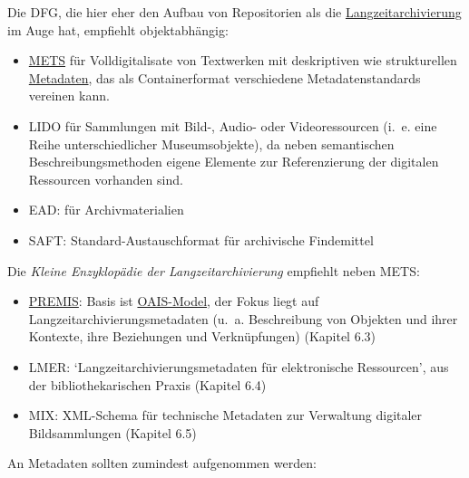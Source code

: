 \documentclass{article}
\begin{document}
        Die DFG, die hier eher den Aufbau von Repositorien als die \href{http://gams.uni-graz.at/o:konde.6}{Langzeitarchivierung} im Auge hat, empfiehlt objektabhängig: \\
            
        \begin{itemize}\item {\href{http://gams.uni-graz.at/o:konde.129}{METS} für Volldigitalisate von Textwerken mit deskriptiven wie strukturellen \href{http://gams.uni-graz.at/o:konde.25}{Metadaten}, das als Containerformat verschiedene Metadatenstandards vereinen kann.}\item {LIDO für Sammlungen mit Bild-, Audio- oder Videoressourcen (i. e. eine Reihe unterschiedlicher Museumsobjekte), da neben semantischen Beschreibungsmethoden eigene Elemente zur Referenzierung der digitalen Ressourcen vorhanden sind.}\item {EAD: für Archivmaterialien}\item {SAFT: Standard-Austauschformat für archivische Findemittel}\end{itemize}Die \emph{Kleine Enzyklopädie der Langzeitarchivierung} empfiehlt neben METS:\\
            
        \begin{itemize}\item {\href{http://gams.uni-graz.at/o:konde.130}{PREMIS}:  Basis ist \href{http://gams.uni-graz.at/o:konde.11}{OAIS-Model}, der Fokus liegt auf Langzeitarchivierungsmetadaten (u. a. Beschreibung von Objekten und ihrer Kontexte, ihre Beziehungen und Verknüpfungen) (Kapitel 6.3)}\item {LMER: ‘Langzeitarchivierungsmetadaten für elektronische Ressourcen’, aus der bibliothekarischen Praxis  (Kapitel 6.4)}\item {MIX: XML-Schema für technische Metadaten zur Verwaltung digitaler Bildsammlungen  (Kapitel 6.5)}\end{itemize}An Metadaten sollten zumindest aufgenommen werden:\\
            
\end{document}
